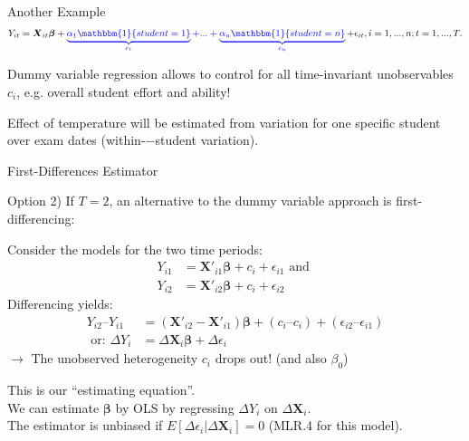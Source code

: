 \documentclass[11pt, aspectratio = 169]{beamer}
\begin{document}
\begin{frame}{Another Example}
\begin{align*}
       Y_{it} = \boldsymbol{X}_{it} \boldsymbol{\beta} +  \color{blue} \underbrace{\alpha_1 \mathbbm{1}\{student = 1\}}_{c_1} + ... + \underbrace{\alpha_n \mathbbm{1}\{student = n\}}_{c_n}\color{black}
       + \epsilon_{it} , i = 1, ... , n; t = 1, ... , T. 
\end{align*}

Dummy variable regression allows to control for all time-invariant unobservables $c_i$, e.g. overall student effort and ability!

Effect of temperature will be estimated from variation for one specific student over exam dates (within-−student variation). 

\end{frame}

\begin{frame}{First-Differences Estimator}

Option 2) If $T = 2$, an alternative to the dummy variable approach is first-differencing:

Consider the models for the two time periods:
\begin{align*}
    Y_{i1}& = \boldsymbol{X}'_{i1}\boldsymbol{\beta} + c_i + \epsilon_{i1}  \text{ and  } \\
Y_{i2} &= \boldsymbol{X}'_{i2}\boldsymbol{\beta} + c_i + \epsilon_{i2}   
\end{align*}
Differencing yields: 
\begin{align*}
Y_{i2} – Y_{i1} &= (\boldsymbol{X}'_{i2} - \boldsymbol{X}'_{i1}) \boldsymbol{\beta} + (c_i – c_i) + (\epsilon_{i2} – \epsilon_{i1}) \\
\text{ or: } \Delta Y_i &= \Delta \boldsymbol{X}_{i} \boldsymbol{\beta} + \Delta\epsilon_i
\end{align*}
$\rightarrow$ The unobserved heterogeneity $c_i$ drops out! (and also $\beta_0$)

\pause 
This is our “estimating equation”. \\
We can estimate $\boldsymbol{\beta}$ by OLS by regressing $\Delta Y_i$ on $\Delta \boldsymbol{X}_i$. \\
The estimator is unbiased if $E[\Delta\epsilon_i|\Delta \boldsymbol{X}_{i}] = 0$ (MLR.4 for this model).
\end{frame}
\end{document}
